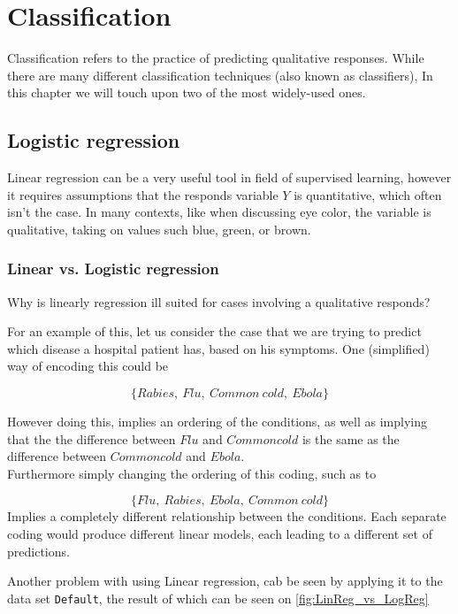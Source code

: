 \graphicspath{{Chapters/2_logistic_regression/}}

\chapter{Classification}

Classification refers to the practice of predicting qualitative responses. While there are many different classification techniques (also known as classifiers), In this chapter we will touch upon two of the most widely-used ones.

\section{Logistic regression}

Linear regression can be a very useful tool in field of supervised learning, however it requires assumptions that the responds variable $Y$ is quantitative, which often isn't the case. In many contexts, like when discussing eye color, the variable is qualitative, taking on values such blue, green, or brown.

\subsection{Linear vs. Logistic regression}

Why is linearly regression ill suited for cases involving a qualitative responds?

For an example of this, let us consider the case that we are trying to predict which disease a hospital patient has, based on his symptoms. One (simplified) way of encoding this could be

$$\{Rabies,\ Flu,\ Common\ cold,\ Ebola\}$$

However doing this, implies an ordering of the conditions, as well as implying that the the difference between $Flu$ and $Common cold$ is the same as the difference between $Common cold$ and $Ebola$.\\
Furthermore simply changing the ordering of this coding, such as to 

$$\{Flu,\ Rabies,\ Ebola,\ Common\ cold\}$$ Implies a completely different relationship between the conditions. Each separate coding would produce different linear models, each leading to a different set of predictions.

Another problem with using Linear regression, cab be seen by applying it to the data set \texttt{Default}, the result of which can be seen on \cref{fig:LinReg_vs_LogReg}

